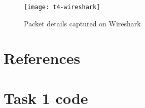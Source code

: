 \documentclass{article}
\begin{document}
\newpage
	\begin{figure}[h]
		\centering
		\texttt{[image: t4-wireshark]}
		\caption{Packet details captured on Wireshark}
		\label{fig:t4-6}
	\end{figure}
	

\newpage
\section{References}



\newpage
\begin{center} 
\end{center}
\renewcommand{\thesection}{\alph{section}}
\setcounter{section}{0}
\section{Task 1 code}
\end{document}
